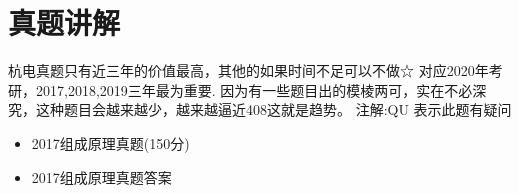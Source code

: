 \chapter{真题讲解}
\label{chap22}

杭电真题只有近三年的价值最高，其他的如果时间不足可以不做☆ \newline
对应2020年考研，2017,2018,2019三年最为重要.\newline
因为有一些题目出的模棱两可，实在不必深究，这种题目会越来越少，越来越逼近408这就是趋势。\newline
注解:QU 表示此题有疑问\newline
\begin{itemize}[noitemsep,topsep=0pt,parsep=0pt,partopsep=0pt]
	\item 2017组成原理真题(150分)
	\item 2017组成原理真题答案
\end{itemize}


